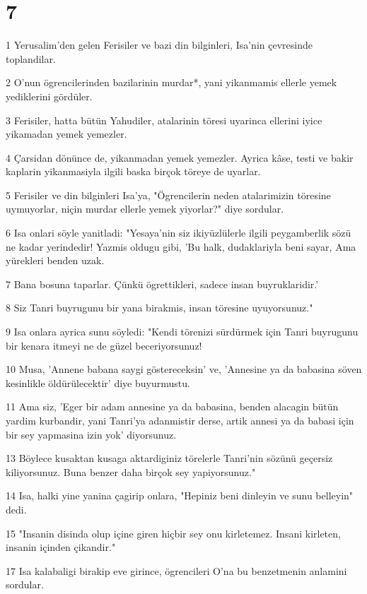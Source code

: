\chapter{7}

\par 1 Yerusalim'den gelen Ferisiler ve bazi din bilginleri, Isa'nin çevresinde toplandilar.
\par 2 O'nun ögrencilerinden bazilarinin murdar*, yani yikanmamis ellerle yemek yediklerini gördüler.
\par 3 Ferisiler, hatta bütün Yahudiler, atalarinin töresi uyarinca ellerini iyice yikamadan yemek yemezler.
\par 4 Çarsidan dönünce de, yikanmadan yemek yemezler. Ayrica kâse, testi ve bakir kaplarin yikanmasiyla ilgili baska birçok töreye de uyarlar.
\par 5 Ferisiler ve din bilginleri Isa'ya, "Ögrencilerin neden atalarimizin töresine uymuyorlar, niçin murdar ellerle yemek yiyorlar?" diye sordular.
\par 6 Isa onlari söyle yanitladi: "Yesaya'nin siz ikiyüzlülerle ilgili peygamberlik sözü ne kadar yerindedir! Yazmis oldugu gibi, 'Bu halk, dudaklariyla beni sayar, Ama yürekleri benden uzak.
\par 7 Bana bosuna taparlar. Çünkü ögrettikleri, sadece insan buyruklaridir.'
\par 8 Siz Tanri buyrugunu bir yana birakmis, insan töresine uyuyorsunuz."
\par 9 Isa onlara ayrica sunu söyledi: "Kendi törenizi sürdürmek için Tanri buyrugunu bir kenara itmeyi ne de güzel beceriyorsunuz!
\par 10 Musa, 'Annene babana saygi göstereceksin' ve, 'Annesine ya da babasina söven kesinlikle öldürülecektir' diye buyurmustu.
\par 11 Ama siz, 'Eger bir adam annesine ya da babasina, benden alacagin bütün yardim kurbandir, yani Tanri'ya adanmistir derse, artik annesi ya da babasi için bir sey yapmasina izin yok' diyorsunuz.
\par 13 Böylece kusaktan kusaga aktardiginiz törelerle Tanri'nin sözünü geçersiz kiliyorsunuz. Buna benzer daha birçok sey yapiyorsunuz."
\par 14 Isa, halki yine yanina çagirip onlara, "Hepiniz beni dinleyin ve sunu belleyin" dedi.
\par 15 "Insanin disinda olup içine giren hiçbir sey onu kirletemez. Insani kirleten, insanin içinden çikandir."
\par 17 Isa kalabaligi birakip eve girince, ögrencileri O'na bu benzetmenin anlamini sordular.
